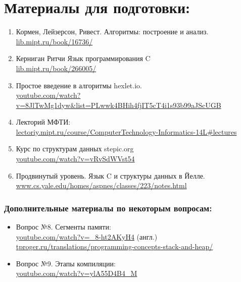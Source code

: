 \documentclass{article}
\begin{document}
\section*{Материалы для подготовки:}
\begin{enumerate}
\item Кормен, Лейзерсон, Ривест. Алгоритмы: построение и анализ.\\ 
\hspace*{16pt} \href{https://lib.mipt.ru/book/16736/}{lib.mipt.ru/book/16736/}
\item Керниган Ритчи Язык программирования C \\
\hspace*{16pt} \href{https://lib.mipt.ru/book/266005/}{lib.mipt.ru/book/266005/}
\item Простое введение в алгоритмы hexlet.io. \\ \hspace*{16pt} \href{https://www.youtube.com/watch?v=8JlTwMg1dyw&list=PLwwk4BHih4fjIT5cT4i1s93b99aJScUGB}{youtube.com/watch?v=8JlTwMg1dyw\&list=PLwwk4BHih4fjIT5cT4i1s93b99aJScUGB}
\item Лекторий МФТИ: \\ \hspace*{16pt} 
\href{http://lectoriy.mipt.ru/course/ComputerTechnology-Informatics-14L#lectures}
{lectoriy.mipt.ru/course/ComputerTechnology-Informatics-14L\#lectures}
\item Курс по структурам данных stepic.org  \\
\hspace*{16pt} \href{https://www.youtube.com/watch?v=vRvSdWVst54}{youtube.com/watch?v=vRvSdWVst54}
\item Продвинутый уровень. Язык C и структуры данных в Йелле.\\ \hspace*{16pt} \href{http://www.cs.yale.edu/homes/aspnes/classes/223/notes.html}{www.cs.yale.edu/homes/aspnes/classes/223/notes.html}
\end{enumerate}

\subsubsection*{Дополнительные материалы по некоторым вопросам:}
\begin{itemize}

\item Вопрос №8. Сегменты памяти:\\
\href{https://www.youtube.com/watch?v=_8-ht2AKyH4}{youtube.com/watch?v=\_8-ht2AKyH4}  (англ.)\\
\href{https://tproger.ru/translations/programming-concepts-stack-and-heap/}{tproger.ru/translations/programming-concepts-stack-and-heap/}
\item Вопрос №9. Этапы компиляции:\\
\href{https://www.youtube.com/watch?v=ylA55D4B4_M}{youtube.com/watch?v=ylA55D4B4\_M}

\end{itemize}
\end{document}
